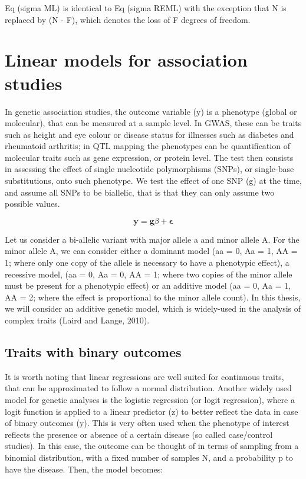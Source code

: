 Eq (sigma ML) is identical to Eq (sigma REML) with the exception that N is replaced by (N - F), which denotes the loss of F degrees of freedom.


\section{Linear models for association studies}

In genetic association studies, the outcome variable (y) is a phenotype (global or molecular), that can be measured at a sample level. In GWAS, these can be traits such as height and eye colour or disease status for illnesses such as diabetes and rheumatoid arthritis; in QTL mapping the phenotypes can be quantification of molecular traits such as gene expression, or protein level. The test then consists in assessing the effect of single nucleotide polymorphisms (SNPs), or single-base substitutions, onto such phenotype. We test the effect of one SNP (g) at the time, and assume all SNPs to be biallelic, that is that they can only assume two possible values. 

\[ \mathbf{y} = \mathbf{g}\beta + \boldsymbol{\epsilon} \]

Let us consider a bi-allelic variant with major allele a and minor allele A. For the minor allele A, we can consider either a dominant model (aa = 0, Aa = 1, AA = 1; where only one copy of the allele is necessary to have a phenotypic effect), a recessive model, (aa = 0, Aa = 0, AA = 1; where two copies of the minor allele must be present for a phenotypic effect) or an additive model (aa = 0, Aa = 1, AA = 2; where the effect is proportional to the minor allele count). In this thesis, we will consider an additive genetic model, which is widely-used in the analysis of complex traits (Laird and Lange, 2010).

\subsection{Traits with binary outcomes}

It is worth noting that linear regressions are well suited for continuous traits, that can be approximated to follow a normal distribution. Another widely used model for genetic analyses is the logistic regression (or logit regression), where a logit function is applied to a linear predictor (z) to better reflect the data in case of binary outcomes (y). This is very often used when the phenotype of interest reflects the presence or absence of a certain disease (so called case/control studies). In this case, the outcome can be thought of in terms of sampling from a binomial distribution, with a fixed number of samples N, and a probability p to have the disease. Then, the model becomes:

